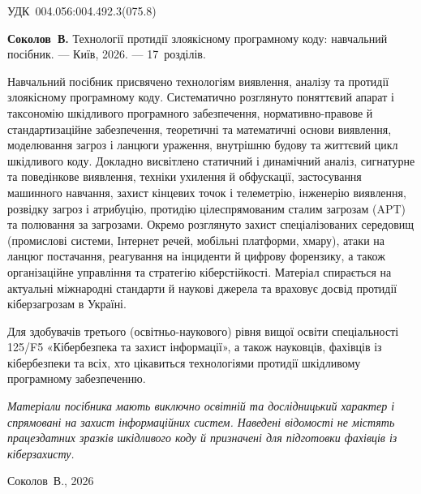 \thispagestyle{empty}
\begin{flushleft}
{\footnotesize УДК~004.056:004.492.3(075.8)\par}
\end{flushleft}

\vspace{2mm}

{\footnotesize\noindent
\textbf{Соколов~В.} Технології протидії злоякісному програмному коду: навчальний посібник. --- Київ, 2026. --- 17~розділів.\par}

\vspace{4mm}

{\footnotesize\noindent
Навчальний посібник присвячено технологіям виявлення, аналізу та протидії злоякісному програмному коду. Систематично розглянуто поняттєвий апарат і таксономію шкідливого програмного забезпечення, нормативно-правове й стандартизаційне забезпечення, теоретичні та математичні основи виявлення, моделювання загроз і ланцюги ураження, внутрішню будову та життєвий цикл шкідливого коду. Докладно висвітлено статичний і динамічний аналіз, сигнатурне та поведінкове виявлення, техніки ухилення й обфускації, застосування машинного навчання, захист кінцевих точок і телеметрію, інженерію виявлення, розвідку загроз і атрибуцію, протидію цілеспрямованим сталим загрозам (APT) та полювання за загрозами. Окремо розглянуто захист спеціалізованих середовищ (промислові системи, Інтернет речей, мобільні платформи, хмару), атаки на ланцюг постачання, реагування на інциденти й цифрову форензику, а також організаційне управління та стратегію кіберстійкості. Матеріал спирається на актуальні міжнародні стандарти й наукові джерела та враховує досвід протидії кіберзагрозам в Україні.\par}

\vspace{4mm}

{\footnotesize\noindent
Для здобувачів третього (освітньо-наукового) рівня вищої освіти спеціальності 125/F5 «Кібербезпека та захист інформації», а також науковців, фахівців із кібербезпеки та всіх, хто цікавиться технологіями протидії шкідливому програмному забезпеченню.\par}

\vfill

{\footnotesize\noindent
\emph{Матеріали посібника мають виключно освітній та дослідницький характер і спрямовані на захист інформаційних систем. Наведені відомості не містять працездатних зразків шкідливого коду й призначені для підготовки фахівців із кіберзахисту.}\par}

\vspace{3mm}

{\footnotesize\noindent \textcopyright{} Соколов~В., 2026\par}
